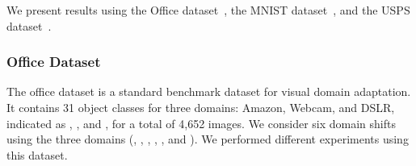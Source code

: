 \begin{table}[t]
\caption{\textbf{VLCS dataset.} Classification accuracy for domain generalization over the 5 categories of the VLCS dataset. {\tt LB} (Lower Bound) is our base model trained without the contrastive semantic alignment loss. {\tt 1NN} stands for first nearest neighbor. }
\label{tab-VLCS}
\centering
{}
\end{table}



We present results using the Office dataset~\cite{saenkoKFD2010eccv}, the MNIST dataset~\cite{lecun1998gradient}, and the USPS dataset~\cite{hull1994database}.

\subsubsection{Office Dataset} 

The office dataset is a standard benchmark dataset for visual domain adaptation. It contains 31 object classes for three domains: Amazon, Webcam, and DSLR, indicated as , , and , for a total of 4,652 images. We consider six domain shifts using the three domains (, , , , , and ). We performed different experiments using this dataset.

